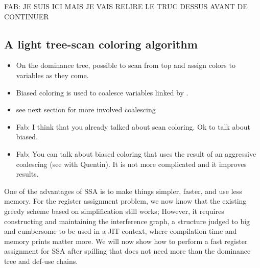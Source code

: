 {FAB: JE SUIS ICI MAIS JE VAIS RELIRE LE TRUC DESSUS AVANT DE CONTINUER
\subsection{A light tree-scan coloring algorithm}
{\sl
\begin{itemize}
  \item On the dominance tree, possible to scan from top and assign colors to 
    variables as they come.
  \item Biased coloring is used to coalesce variables linked by \phifuns.
  \item see next section for more involved coalescing
  \item Fab: I think that you already talked about scan coloring. Ok to talk about biased.
  \item Fab: You can talk about biased coloring that uses the result of an aggressive coalescing (see with Quentin). It is not more complicated and it improves results.
\end{itemize}
}

One of the advantages of SSA is to make things simpler, faster, and use less memory. 
For the register assignment problem, we now know that the existing greedy scheme based on simplification still works; 
However, it requires constructing and maintaining the interference graph, a structure judged to big and cumbersome to be used in a JIT context, where compilation time and memory prints matter more. 
We will now show how to perform a fast register assignment for SSA after spilling that does not need more than the dominance tree and def-use chains. 



}
